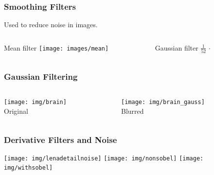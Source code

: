 \begin{frame}
    \frametitle{Smoothing Filters}
    Used to reduce noise in images.
    \begin{columns}[T, onlytextwidth]
        \begin{column}{0.45\textwidth}
            \begin{block}{Mean filter}\centering\bigskip\bigskip
                \texttt{[image: images/mean]}
            \end{block}
        \end{column}
        \begin{column}{0.45\textwidth}
            \begin{block}{Gaussian filter}\centering\bigskip\bigskip
                $\displaystyle\frac{1}{52}\,\cdot\,$ 
            \end{block}
        \end{column}
    \end{columns}
\end{frame}

\begin{frame}
    \frametitle{Gaussian Filtering}
    \begin{columns}[onlytextwidth]
        \begin{column}{0.5\textwidth}\centering
            \centering{}
            \texttt{[image: img/brain]}\\Original
        \end{column}%
        \begin{column}{0.5\textwidth}\centering
            \centering{}
            \texttt{[image: img/brain\_gauss]}\\Blurred
        \end{column}
    \end{columns}
\end{frame}



\begin{frame}
	\frametitle{Derivative Filters and Noise}
	\texttt{[image: img/lenadetailnoise]}
	 \texttt{[image: img/nonsobel]}
	 \texttt{[image: img/withsobel]}
\end{frame}

